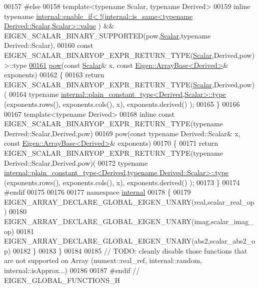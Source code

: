 \begin{DoxyCode}
00157 \textcolor{preprocessor}{#else}
00158   \textcolor{keyword}{template}<\textcolor{keyword}{typename} Scalar, \textcolor{keyword}{typename} Derived>
00159   \textcolor{keyword}{inline} \textcolor{keyword}{typename} 
      \hyperlink{struct_eigen_1_1internal_1_1enable__if}{internal::enable\_if<   !(internal::is\_same<typename Derived::Scalar,Scalar>::value}
      ) && EIGEN\_SCALAR\_BINARY\_SUPPORTED(pow,\hyperlink{group___core___module_a5feed465b3a8e60c47e73ecce83e39a2}{Scalar},\textcolor{keyword}{typename} Derived::Scalar),
00160           \textcolor{keyword}{const} EIGEN\_SCALAR\_BINARYOP\_EXPR\_RETURN\_TYPE(\hyperlink{group___core___module_a5feed465b3a8e60c47e73ecce83e39a2}{Scalar},Derived,pow) >::type
\hyperlink{group___core___module_a7db6f1ad242a31a2fa421f500d1258c5}{00161}   \hyperlink{group___core___module_a7db6f1ad242a31a2fa421f500d1258c5}{pow}(\textcolor{keyword}{const} \hyperlink{group___core___module_a5feed465b3a8e60c47e73ecce83e39a2}{Scalar}& x, \textcolor{keyword}{const} \hyperlink{group___core___module_class_eigen_1_1_array_base}{Eigen::ArrayBase<Derived>}& exponents)
00162   \{
00163     \textcolor{keywordflow}{return} EIGEN\_SCALAR\_BINARYOP\_EXPR\_RETURN\_TYPE(\hyperlink{group___core___module_a5feed465b3a8e60c47e73ecce83e39a2}{Scalar},Derived,pow)(
00164             \textcolor{keyword}{typename} \hyperlink{group___core___module_class_eigen_1_1_cwise_nullary_op}{internal::plain\_constant\_type<Derived,Scalar>::type}
      (exponents.rows(), exponents.cols(), x), exponents.derived() );
00165   \}
00166 
00167   \textcolor{keyword}{template}<\textcolor{keyword}{typename} Derived>
00168   \textcolor{keyword}{inline} \textcolor{keyword}{const} EIGEN\_SCALAR\_BINARYOP\_EXPR\_RETURN\_TYPE(\textcolor{keyword}{typename} Derived::Scalar,Derived,pow)
00169   pow(\textcolor{keyword}{const} \textcolor{keyword}{typename} Derived::Scalar& x, \textcolor{keyword}{const} \hyperlink{group___core___module_class_eigen_1_1_array_base}{Eigen::ArrayBase<Derived>}& 
      exponents)
00170   \{
00171     \textcolor{keywordflow}{return} EIGEN\_SCALAR\_BINARYOP\_EXPR\_RETURN\_TYPE(\textcolor{keyword}{typename} Derived::Scalar,Derived,pow)(
00172       \textcolor{keyword}{typename} 
      \hyperlink{group___core___module_class_eigen_1_1_cwise_nullary_op}{internal::plain\_constant\_type<Derived,typename Derived::Scalar>::type}
      (exponents.rows(), exponents.cols(), x), exponents.derived() );
00173   \}
00174 \textcolor{preprocessor}{#endif}
00175 
00176 
00177   \textcolor{keyword}{namespace }\hyperlink{namespaceinternal}{internal}
00178   \{
00179     EIGEN\_ARRAY\_DECLARE\_GLOBAL\_EIGEN\_UNARY(real,scalar\_real\_op)
00180     EIGEN\_ARRAY\_DECLARE\_GLOBAL\_EIGEN\_UNARY(imag,scalar\_imag\_op)
00181     EIGEN\_ARRAY\_DECLARE\_GLOBAL\_EIGEN\_UNARY(abs2,scalar\_abs2\_op)
00182   \}
00183 \}
00184 
00185 \textcolor{comment}{// TODO: cleanly disable those functions that are not supported on Array (numext::real\_ref,
       internal::random, internal::isApprox...)}
00186 
00187 \textcolor{preprocessor}{#endif // EIGEN\_GLOBAL\_FUNCTIONS\_H}
\end{DoxyCode}
